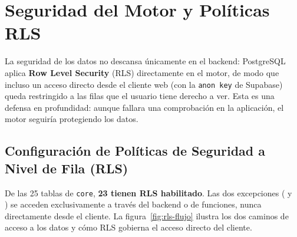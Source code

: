 \section{Seguridad del Motor y Políticas RLS}
\label{sec:rls}

La seguridad de los datos no descansa únicamente en el backend: PostgreSQL aplica
\textbf{Row Level Security} (RLS) directamente en el motor, de modo que incluso un acceso
directo desde el cliente web (con la \texttt{anon key} de Supabase) queda restringido a
las filas que el usuario tiene derecho a ver. Esta es una defensa en profundidad: aunque
fallara una comprobación en la aplicación, el motor seguiría protegiendo los datos.

\subsection{Configuración de Políticas de Seguridad a Nivel de Fila (RLS)}
\label{subsec:politicas_rls}

De las 25 tablas de \texttt{core}, \textbf{23 tienen RLS habilitado}. Las dos excepciones
( y \\ ) se acceden
exclusivamente a través del backend o de funciones, nunca directamente desde el cliente.
La figura~\ref{fig:rls-flujo} ilustra los dos caminos de acceso a los datos y cómo RLS
gobierna el acceso directo del cliente.

